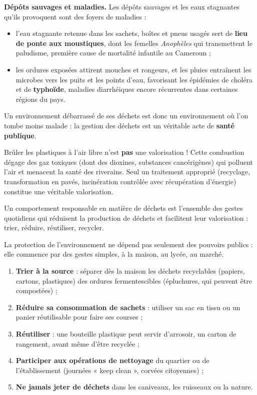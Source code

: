 \documentclass[11pt]{article}
\newcommand{\cle}[1]{{\popxbold\color{popdark}#1}}
\newcounter{popsec}
\newcounter{popsub}
\newcommand{\courssub}[1]{%
  \stepcounter{popsub}%
  \par\vspace{9pt}\noindent{\popxbold\fontsize{11.5}{13}\selectfont\color{popink}{\color{poporange}\thepopsec.\thepopsub}\hspace{6pt}#1}\par\nopagebreak\vspace{4pt}
}
\begin{document}
\textbf{Dépôts sauvages et maladies.} Les dépôts sauvages et les eaux stagnantes qu'ils provoquent sont des foyers de maladies :

\begin{itemize}
\item l'eau stagnante retenue dans les sachets, boîtes et pneus usagés sert de \textbf{lieu de ponte aux moustiques}, dont les femelles \emph{Anophèles} qui transmettent le \cle{paludisme}, première cause de mortalité infantile au Cameroun ;
\item les ordures exposées attirent mouches et rongeurs, et les pluies entraînent les microbes vers les puits et les points d'eau, favorisant les épidémies de \cle{choléra} et de \textbf{typhoïde}, maladies diarrhéiques encore récurrentes dans certaines régions du pays.
\end{itemize}

Un environnement débarrassé de ses déchets est donc un environnement où l'on tombe moins malade : la gestion des déchets est un véritable acte de \textbf{santé publique}.

\begin{attention}
Brûler les plastiques à l'air libre n'est \textbf{pas} une valorisation ! Cette combustion dégage des \cle{gaz toxiques} (dont des dioxines, substances cancérigènes) qui polluent l'air et menacent la santé des riverains. Seul un traitement approprié (recyclage, transformation en pavés, incinération contrôlée avec récupération d'énergie) constitue une véritable valorisation.
\end{attention}

\courssub{La chaîne du comportement responsable}

\begin{definition}
Un \cle{comportement responsable} en matière de déchets est l'ensemble des gestes quotidiens qui réduisent la production de déchets et facilitent leur valorisation : trier, réduire, réutiliser, recycler.
\end{definition}

La protection de l'environnement ne dépend pas seulement des pouvoirs publics : elle commence par des gestes simples, à la maison, au lycée, au marché.

\begin{enumerate}
\item \textbf{Trier à la source} : séparer dès la maison les déchets recyclables (papiers, cartons, plastiques) des ordures fermentescibles (épluchures, qui peuvent être compostées) ;
\item \textbf{Réduire sa consommation de sachets} : utiliser un sac en tissu ou un panier réutilisable pour faire ses courses ;
\item \textbf{Réutiliser} : une bouteille plastique peut servir d'arrosoir, un carton de rangement, avant même d'être recyclée ;
\item \textbf{Participer aux opérations de nettoyage} du quartier ou de l'établissement (journées « keep clean », corvées citoyennes) ;
\item \textbf{Ne jamais jeter de déchets} dans les caniveaux, les ruisseaux ou la nature.
\end{enumerate}
\end{document}
